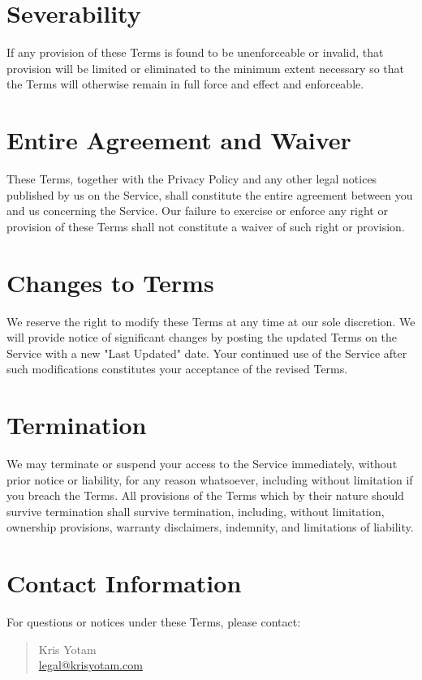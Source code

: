 \documentclass[11pt]{article}
\begin{document}
\section{Severability}
If any provision of these Terms is found to be unenforceable or invalid, that provision will be limited or eliminated to the minimum extent necessary so that the Terms will otherwise remain in full force and effect and enforceable.

\section{Entire Agreement and Waiver}
These Terms, together with the Privacy Policy and any other legal notices published by us on the Service, shall constitute the entire agreement between you and us concerning the Service. Our failure to exercise or enforce any right or provision of these Terms shall not constitute a waiver of such right or provision.

\section{Changes to Terms}
We reserve the right to modify these Terms at any time at our sole discretion. We will provide notice of significant changes by posting the updated Terms on the Service with a new "Last Updated" date. Your continued use of the Service after such modifications constitutes your acceptance of the revised Terms.

\section{Termination}
We may terminate or suspend your access to the Service immediately, without prior notice or liability, for any reason whatsoever, including without limitation if you breach the Terms. All provisions of the Terms which by their nature should survive termination shall survive termination, including, without limitation, ownership provisions, warranty disclaimers, indemnity, and limitations of liability.

\section{Contact Information}
For questions or notices under these Terms, please contact:
\begin{quote}
  Kris Yotam\\
  \href{mailto:legal@krisyotam.com}{legal@krisyotam.com}
\end{quote}
\end{document}
